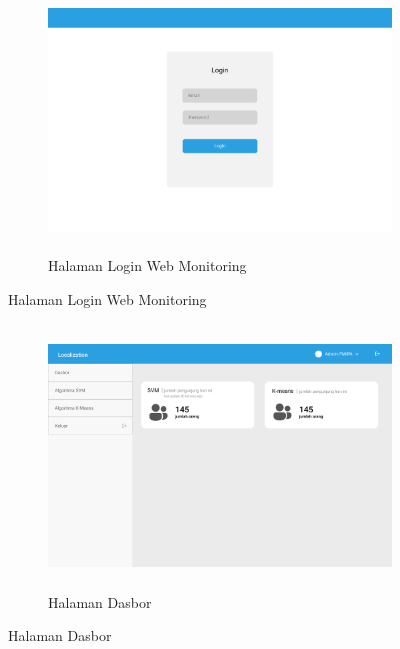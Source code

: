 \begin{enumerate}[a.]
	      \vspace{-0cm}
	      \begin{figure} [H]
		      \begin{subfigure}{.5\textwidth}
			      \centering
			      \includegraphics[width = 13cm, height= 7cm]{gambar/MacBook Pro 14_ - 1.png}
			      \caption{Halaman Login Web Monitoring}
		      \end{subfigure}
	      \end{figure}

	      \vspace{-0cm}
	      \begin{figure} [H]
		      \begin{subfigure}{.5\textwidth}
			      \centering
			      \includegraphics[width = 13cm, height= 7cm]{gambar/MacBook Pro 14_ - 3.png}
			      \caption{Halaman Dasbor}
		      \end{subfigure}
	      \end{figure}


\end{enumerate}
